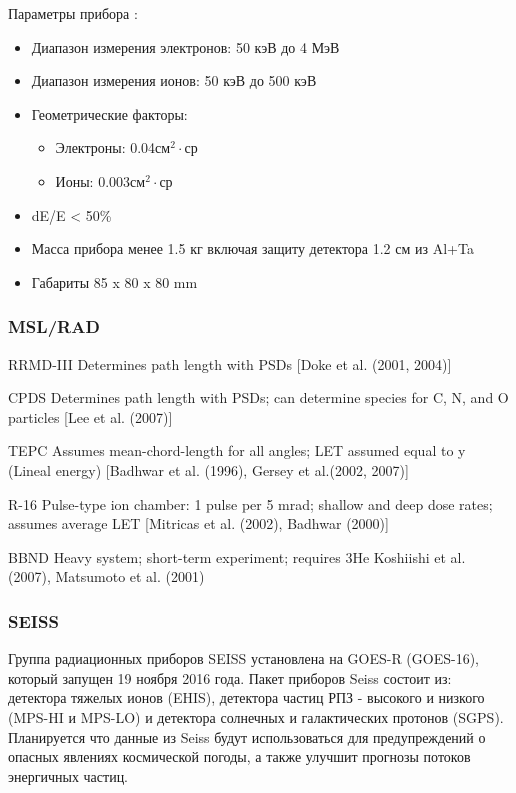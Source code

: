 Параметры прибора :
\begin{itemize}
	\item Диапазон измерения электронов: 50 кэВ до 4 МэВ
	
	\item Диапазон измерения ионов: 50 кэВ до 500 кэВ
	
	\item Геометрические факторы:
	
	\begin{itemize}
		\item Электроны: 0.04см$ ^{2}\cdot $ср
		
		\item Ионы: 0.003см$ ^{2}\cdot $ср
	\end{itemize}
	
	
	\item dE/E < 50\%
	
	\item Масса прибора менее 1.5 кг включая защиту детектора 1.2 см из Al+Ta
	
	\item Габариты 85 x 80 x 80 mm
\end{itemize}






\subsubsection{MSL/RAD}


RRMD-III Determines path length with PSDs [Doke et al. (2001, 2004)]


CPDS Determines path length with PSDs; can determine species for C, N, and O particles [Lee et al. (2007)]


TEPC Assumes mean-chord-length for all angles; LET assumed equal to y (Lineal energy) [Badhwar et al. (1996), Gersey et al.(2002, 2007)]


R-16 Pulse-type ion chamber: 1 pulse per 5 mrad; shallow and deep dose rates; assumes average LET [Mitricas et al. (2002), Badhwar (2000)]


BBND Heavy system; short-term experiment; requires 3He Koshiishi et al. (2007), Matsumoto et al. (2001)

\subsubsection{SEISS}
Группа радиационных приборов SEISS установлена на GOES-R (GOES-16)\cite{Goodman2013}, который запущен 19 ноября 2016 года. 
Пакет приборов Seiss состоит из: детектора тяжелых ионов  (EHIS), детектора частиц РПЗ - высокого и низкого (MPS-HI и MPS-LO) и детектора солнечных и галактических протонов (SGPS). Планируется что данные из Seiss будут использоваться для предупреждений о опасных явлениях космической погоды, а также улучшит прогнозы потоков энергичных частиц. 

